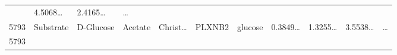 \documentclass[
]{article}
\begin{document}
\begin{longtable}[]{@{}lllllllllll@{}}
\begin{minipage}[t]{0.07\columnwidth}
\end{minipage} & \begin{minipage}[t]{0.07\columnwidth}\raggedright
4.5068\ldots{}\strut
\end{minipage} & \begin{minipage}[t]{0.07\columnwidth}\raggedright
2.4165\ldots{}\strut
\end{minipage} & \begin{minipage}[t]{0.03\columnwidth}\raggedright
\ldots{}\strut
\end{minipage}\tabularnewline
\begin{minipage}[t]{0.03\columnwidth}\raggedright
5793\strut
\end{minipage} & \begin{minipage}[t]{0.07\columnwidth}\raggedright
Substrate\strut
\end{minipage} & \begin{minipage}[t]{0.07\columnwidth}\raggedright
D-Glucose\strut
\end{minipage} & \begin{minipage}[t]{0.09\columnwidth}\raggedright
Acetate\strut
\end{minipage} & \begin{minipage}[t]{0.07\columnwidth}\raggedright
Christ\ldots{}\strut
\end{minipage} & \begin{minipage}[t]{0.07\columnwidth}\raggedright
PLXNB2\strut
\end{minipage} & \begin{minipage}[t]{0.09\columnwidth}\raggedright
glucose\strut
\end{minipage} & \begin{minipage}[t]{0.07\columnwidth}\raggedright
0.3849\ldots{}\strut
\end{minipage} & \begin{minipage}[t]{0.07\columnwidth}\raggedright
1.3255\ldots{}\strut
\end{minipage} & \begin{minipage}[t]{0.07\columnwidth}\raggedright
3.5538\ldots{}\strut
\end{minipage} & \begin{minipage}[t]{0.03\columnwidth}\raggedright
\ldots{}\strut
\end{minipage}\tabularnewline
\begin{minipage}[t]{0.03\columnwidth}\raggedright
5793\strut
\end{minipage} & \begin{minipage}[t]{0.07\columnwidth}\raggedright

\end{minipage}
\end{longtable}
\end{document}
